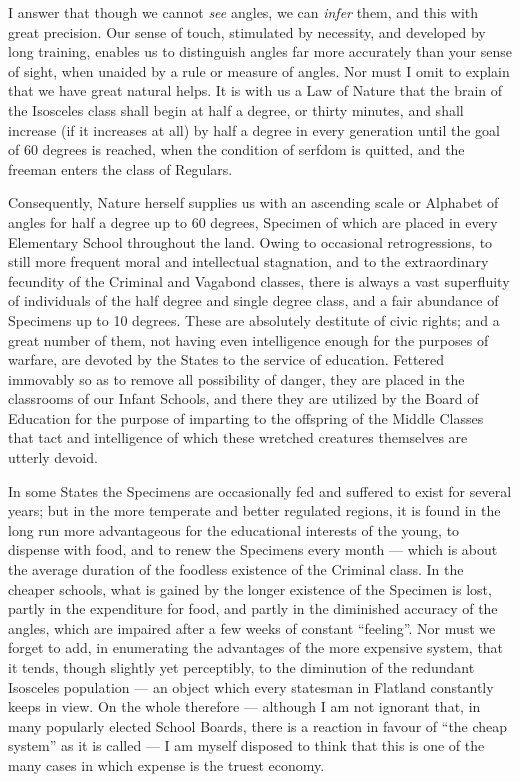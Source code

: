 \documentclass[10pt, kindle, oneside]{kindle}
\begin{document}
I answer that though we cannot \emph{see} angles, we can \emph{infer} them, and this with
great precision. Our sense of touch, stimulated by necessity, and developed by
long training, enables us to distinguish angles far more accurately than your
sense of sight, when unaided by a rule or measure of angles. Nor must I omit
to explain that we have great natural helps. It is with us a Law of Nature
that the brain of the Isosceles class shall begin at half a degree, or thirty
minutes, and shall increase (if it increases at all) by half a degree in every
generation until the goal of 60 degrees is reached, when the condition of
serfdom is quitted, and the freeman enters the class of Regulars.

Consequently, Nature herself supplies us with an ascending scale or Alphabet
of angles for half a degree up to 60 degrees, Specimen of which are placed in
every Elementary School throughout the land. Owing to occasional
retrogressions, to still more frequent moral and intellectual stagnation, and
to the extraordinary fecundity of the Criminal and Vagabond classes, there is
always a vast superfluity of individuals of the half degree and single degree
class, and a fair abundance of Specimens up to 10 degrees. These are
absolutely destitute of civic rights; and a great number of them, not having
even intelligence enough for the purposes of warfare, are devoted by the
States to the service of education. Fettered immovably so as to remove all
possibility of danger, they are placed in the classrooms of our Infant
Schools, and there they are utilized by the Board of Education for the purpose
of imparting to the offspring of the Middle Classes that tact and intelligence
of which these wretched creatures themselves are utterly devoid.

In some States the Specimens are occasionally fed and suffered to exist for
several years; but in the more temperate and better regulated regions, it is
found in the long run more advantageous for the educational interests of the
young, to dispense with food, and to renew the Specimens every month --- which
is about the average duration of the foodless existence of the Criminal class.
In the cheaper schools, what is gained by the longer existence of the Specimen
is lost, partly in the expenditure for food, and partly in the diminished
accuracy of the angles, which are impaired after a few weeks of constant
``feeling''. Nor must we forget to add, in enumerating the advantages of the
more expensive system, that it tends, though slightly yet perceptibly, to the
diminution of the redundant Isosceles population --- an object which every
statesman in Flatland constantly keeps in view. On the whole therefore ---
although I am not ignorant that, in many popularly elected School Boards,
there is a reaction in favour of ``the cheap system'' as it is called --- I am
myself disposed to think that this is one of the many cases in which expense
is the truest economy.
\end{document}
